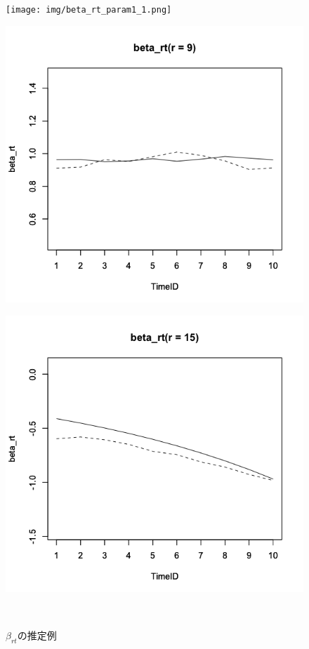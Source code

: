 \documentclass[a4paper,11pt,oneside,openany]{jsbook}
\begin{document}
\begin{figure}[]
 \begin{minipage}[b]{0.3\linewidth}
  \centering
  \texttt{[image: img/beta\_rt\_param1\_1.png]}
  \label{1}
 \end{minipage}
 \begin{minipage}[b]{0.3\linewidth}
  \centering
  \includegraphics[keepaspectratio,scale=0.25]{img/beta_rt_param_9.png}
  \label{2}
 \end{minipage}
 \begin{minipage}[b]{0.3\linewidth}
  \centering
  \includegraphics[keepaspectratio,scale=0.25]{img/beta_rt_param_15.png}
  \label{3}
 \end{minipage}\\
 \caption{$\beta_{rt}$の推定例}\label{beta_rt_recovery}
\end{figure}
\end{document}
